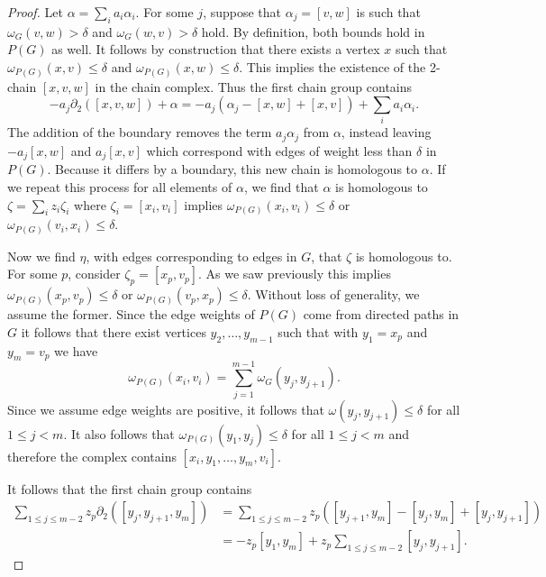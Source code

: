 \documentclass[pdflatex,bst/sn-mathphys-num]{sn-jnl}%
\newcommand{\toti}[1] {{\textcolor{pink}{{\sf Tobias: } #1}}}
\newcommand{\miguel}[1] {{\textcolor{brown}{{\sf Miguel: } #1}}}
\theoremstyle{thmstyleone}%
\theoremstyle{definition}
\theoremstyle{thmstyletwo}%
\theoremstyle{thmstylethree}%
\begin{document}
\begin{proof}
    Let $\alpha=\sum_i a_i\alpha_i$. For some $j$, suppose that $\alpha_j=[v,w]$ is such that $\omega_G(v,w) > \delta$ and $\omega_G(w,v) > \delta$ hold. By definition, both bounds hold in $P(G)$ as well. It follows by construction that there exists a vertex $x$ such that $\omega_{P(G)}(x,v)\leq \delta$ and $\omega_{P(G)}(x,w)\leq \delta$. This implies the existence of the 2-chain $[x,v,w]$ in the chain complex. Thus the first chain group contains
    \[
    -a_j \partial_2([x,v,w]) + \alpha
    = -a_j (\alpha_j-[x,w]+[x,v]) + \sum_i a_i\alpha_i.
    \]
    The addition of the boundary removes the term $a_j\alpha_j$ from $\alpha$, instead leaving $-a_j[x,w]$ and $a_j[x,v]$ which correspond with edges of weight less than $\delta$ in $P(G)$.
    Because it differs by a boundary, this new chain is homologous to $\alpha$. If we repeat this process for all elements of $\alpha$, we find that $\alpha$ is homologous to $\zeta=\sum_i z_i \zeta_i$ where $\zeta_i=[x_i,v_i]$ implies $\omega_{P(G)}(x_i,v_i)\leq \delta$ or $\omega_{P(G)}(v_i,x_i)\leq \delta$.

    Now we find $\eta$, with edges corresponding to edges in $G$, that $\zeta$ is homologous to. For some $p$, consider $\zeta_p=[x_p,v_p]$. As we saw previously this implies $\omega_{P(G)}(x_p,v_p)\leq \delta$ or $\omega_{P(G)}(v_p,x_p)\leq \delta$. Without loss of generality, we assume the former. Since the edge weights of $P(G)$ come from directed paths in $G$ it follows that there exist vertices $y_2,\dotsc,y_{m-1}$ such that with $y_1=x_p$ and $y_m=v_p$ we have
    \[
    \omega_{P(G)}(x_i,v_i)=\sum_{j=1}^{m-1}\omega_G(y_j,y_{j+1}).
    \]
    Since we assume edge weights are positive, it follows that  $\omega(y_j,y_{j+1})\leq \delta$ for all $1\leq j<m$. It also follows that $\omega_{P(G)}(y_1,y_j)\leq \delta$ for all $1\leq j<m$ and therefore the complex contains $[x_i,y_1,\dotsc,y_m,v_i]$.

    It follows that the first chain group contains
    \begin{align*}
        \sum_{1\leq j\leq m-2} 
        z_p \partial_2([y_j,y_{j+1},y_m])
        &=
        \sum_{1\leq j\leq m-2} 
        z_p ([y_{j+1},y_m]-[y_j,y_m]+[y_j,y_{j+1}])
        \\
        &=
        -z_p[y_1,y_m]+z_p \sum_{1\leq j\leq m-2} [y_j,y_{j+1}].
    \end{align*}


\end{proof}
\end{document}

